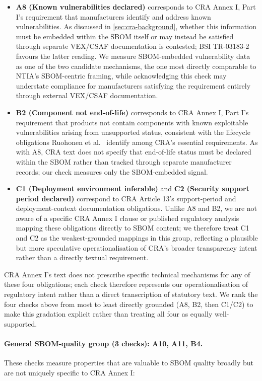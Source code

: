 \documentclass[11pt]{article}
\begin{document}
\begin{itemize}
\item \textbf{A8 (Known vulnerabilities declared)} corresponds to CRA Annex I, Part I's requirement that manufacturers identify and address known vulnerabilities. As discussed in \cref{sec:cra-background}, whether this information must be embedded within the SBOM itself or may instead be satisfied through separate VEX/CSAF documentation is contested; BSI TR-03183-2 \cite{bsi2025} favours the latter reading. We measure SBOM-embedded vulnerability data as one of the two candidate mechanisms, the one most directly comparable to NTIA's SBOM-centric framing, while acknowledging this check may understate compliance for manufacturers satisfying the requirement entirely through external VEX/CSAF documentation.
\item \textbf{B2 (Component not end-of-life)} corresponds to CRA Annex I, Part I's requirement that products not contain components with known exploitable vulnerabilities arising from unsupported status, consistent with the lifecycle obligations Ruohonen et al.\ \cite{ruohonen2025gdpr} identify among CRA's essential requirements. As with A8, CRA text does not specify that end-of-life status must be declared within the SBOM rather than tracked through separate manufacturer records; our check measures only the SBOM-embedded signal.
\item \textbf{C1 (Deployment environment inferable)} and \textbf{C2 (Security support period declared)} correspond to CRA Article 13's support-period and deployment-context documentation obligations. Unlike A8 and B2, we are not aware of a specific CRA Annex I clause or published regulatory analysis mapping these obligations directly to SBOM content; we therefore treat C1 and C2 as the weakest-grounded mappings in this group, reflecting a plausible but more speculative operationalisation of CRA's broader transparency intent rather than a directly textual requirement.
\end{itemize}

CRA Annex I's text does not prescribe specific technical mechanisms for any of these four obligations; each check therefore represents our operationalisation of regulatory intent rather than a direct transcription of statutory text. We rank the four checks above from most to least directly grounded (A8, B2, then C1/C2) to make this gradation explicit rather than treating all four as equally well-supported.

\paragraph{General SBOM-quality group (3 checks): A10, A11, B4.} These checks measure properties that are valuable to SBOM quality broadly but are not uniquely specific to CRA Annex I:
\end{document}
